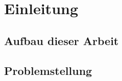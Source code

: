 \chapter{Einleitung}
\label{kap:Kapitel01}
%
       
%
\section{Aufbau dieser Arbeit}
%
 
%
\section{Problemstellung}
%

%

